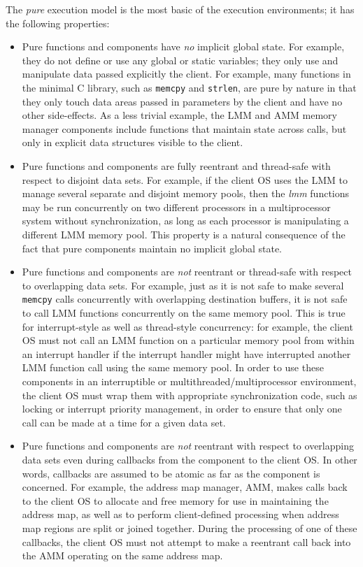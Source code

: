 The \emph{pure} execution model
is the most basic of the \oskit{} execution environments;
it has the following properties:
\begin{itemize}
\item	Pure functions and components have \emph{no} implicit global state.
	For example, they do not define or use any global or static variables;
	they only use and manipulate data passed explicitly the client.
	For example, many functions in the minimal C library,
	such as \texttt{memcpy} and \texttt{strlen},
	are pure by nature in that they only touch data areas
	passed in parameters by the client
	and have no other side-effects.
	As a less trivial example,
	the LMM and AMM memory manager components
	include functions that maintain state across calls,
	but only in explicit data structures visible to the client.
\item	Pure functions and components are fully reentrant and thread-safe
	with respect to disjoint data sets.
	For example, if the client OS uses the LMM
	to manage several separate and disjoint memory pools,
	then the \emph{lmm} functions may be run concurrently
	on two different processors in a multiprocessor system
	without synchronization,
	as long as each processor is manipulating
	a different LMM memory pool.
	This property is a natural consequence
	of the fact that pure \oskit{} components
	maintain no implicit global state.
\item	Pure functions and components are \emph{not} reentrant or thread-safe
	with respect to overlapping data sets.
	For example,
	just as it is not safe to make several \texttt{memcpy} calls
	concurrently with overlapping destination buffers,
	it is not safe to call LMM functions concurrently
	on the same memory pool.
	This is true for interrupt-style as well as thread-style concurrency:
	for example, the client OS must not call an LMM function
	on a particular memory pool from within an interrupt handler
	if the interrupt handler might have interrupted
	another LMM function call using the same memory pool.
	In order to use these components
	in an interruptible or multithreaded/multiprocessor environment,
	the client OS must wrap them with appropriate synchronization code,
	such as locking or interrupt priority management,
	in order to ensure that only one call can be made at a time
	for a given data set.
\item	Pure functions and components are \emph{not} reentrant
	with respect to overlapping data sets
	even during callbacks from the component to the client OS\@.
	In other words, callbacks are assumed to be atomic
	as far as the component is concerned.
	For example, the address map manager, AMM,
	makes calls back to the client OS
	to allocate and free memory
	for use in maintaining the address map,
	as well as to perform client-defined processing
	when address map regions are split or joined together.
	During the processing of one of these callbacks,
	the client OS must not attempt
	to make a reentrant call back into the AMM
	operating on the same address map.
\end{itemize}

